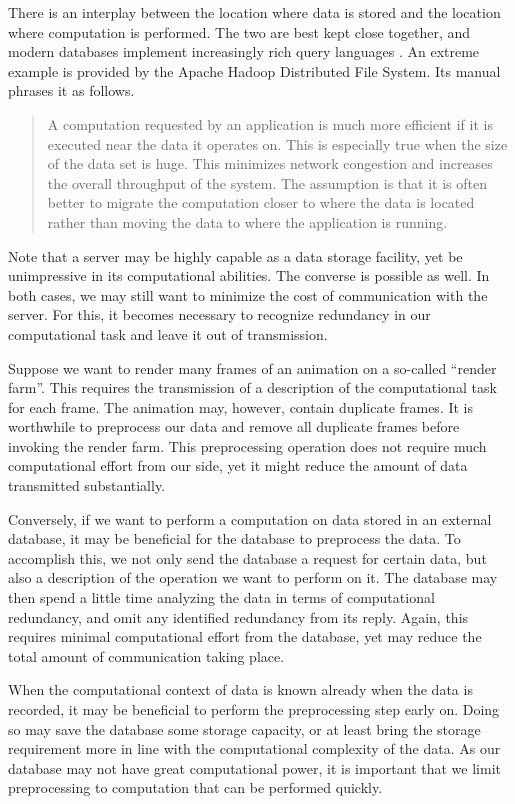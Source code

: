 There is an interplay between the location where data is stored and the location where computation is performed.
The two are best kept close together, and modern databases implement increasingly rich query languages \parencite[see also][]{agarwal2015succinct}.
An extreme example is provided by the {Apache} {Hadoop} Distributed File System.
Its manual phrases it as follows.
\blockcquote{borthakur:hdfs}{
  A computation requested by an application is much more efficient if it is executed near the data it operates on.
  This is especially true when the size of the data set is huge.
  This minimizes network congestion and increases the overall throughput of the system.
  The assumption is that it is often better to migrate the computation closer to where the data is located rather than moving the data to where the application is running.
}

Note that a server may be highly capable as a data storage facility, yet be unimpressive in its computational abilities.
The converse is possible as well.
In both cases, we may still want to minimize the cost of communication with the server.
For this, it becomes necessary to recognize redundancy in our computational task and leave it out of transmission.
\begin{example}
  Suppose we want to render many frames of an animation on a so-called \enquote{render farm}.
  This requires the transmission of a description of the computational task for each frame.
  The animation may, however, contain duplicate frames.
  It is worthwhile to preprocess our data and remove all duplicate frames before invoking the render farm.
  This preprocessing operation does not require much computational effort from our side, yet it might reduce the amount of data transmitted substantially.

  Conversely, if we want to perform a computation on data stored in an external database, it may be beneficial for the database to preprocess the data.
  To accomplish this, we not only send the database a request for certain data, but also a description of the operation we want to perform on it.
  The database may then spend a little time analyzing the data in terms of computational redundancy, and omit any identified redundancy from its reply.
  Again, this requires minimal computational effort from the database, yet may reduce the total amount of communication taking place.
\end{example}

When the computational context of data is known already when the data is recorded, it may be beneficial to perform the preprocessing step early on.
Doing so may save the database some storage capacity, or at least bring the storage requirement more in line with the computational complexity of the data.
As our database may not have great computational power, it is important that we limit preprocessing to computation that can be performed quickly.


